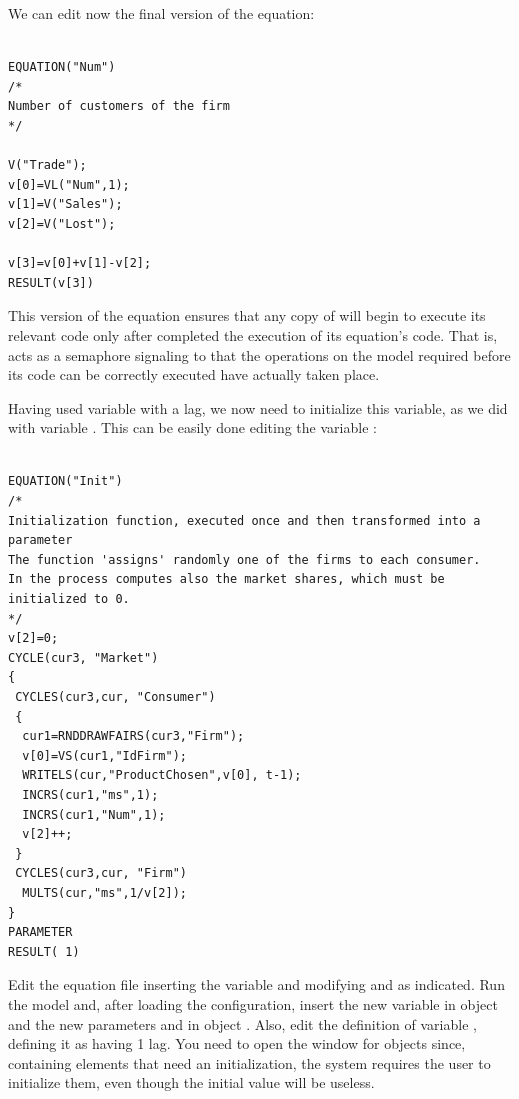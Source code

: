 \documentclass [11pt,a4paper] {book}
\begin{document}
We can edit now the final version of the  equation:

\begin{minipage}[h]{10cm}
\small
\begin{verbatim}

EQUATION("Num")
/*
Number of customers of the firm
*/

V("Trade");
v[0]=VL("Num",1);
v[1]=V("Sales");
v[2]=V("Lost");

v[3]=v[0]+v[1]-v[2];
RESULT(v[3])

\end{verbatim}
\normalsize
\end{minipage}

This version of the equation ensures that any copy of  will begin to execute its relevant code only after  completed the execution of its equation's code. That is,  acts as a semaphore signaling to  that the operations on the model required before its code can be correctly executed have actually taken place.

Having used variable  with a lag, we now need to initialize this variable, as we did with variable . This can be easily done editing the variable :

\begin{minipage}[h]{10cm}
\small
\begin{verbatim}

EQUATION("Init")
/*
Initialization function, executed once and then transformed into a parameter
The function 'assigns' randomly one of the firms to each consumer.
In the process computes also the market shares, which must be initialized to 0.
*/
v[2]=0;
CYCLE(cur3, "Market")
{
 CYCLES(cur3,cur, "Consumer")
 {
  cur1=RNDDRAWFAIRS(cur3,"Firm");
  v[0]=VS(cur1,"IdFirm");
  WRITELS(cur,"ProductChosen",v[0], t-1);
  INCRS(cur1,"ms",1);
  INCRS(cur1,"Num",1);
  v[2]++;
 }
 CYCLES(cur3,cur, "Firm")
  MULTS(cur,"ms",1/v[2]);
}  
PARAMETER
RESULT( 1)

\end{verbatim}
\normalsize
\end{minipage}


Edit the equation file inserting the  variable and modifying  and  as indicated. Run the model and, after loading the configuration, insert the new variable  in object  and the new parameters  and  in object . Also, edit the definition of variable , defining it as having 1 lag. You need to open the  window for objects  since, containing elements that need an initialization, the system requires the user to initialize them, even though the initial value will be useless.
\end{document}
